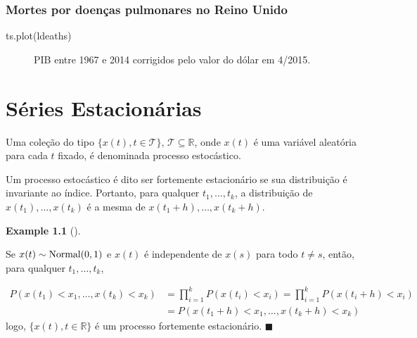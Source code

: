 \documentclass[
  letterpaper,
  DIV=11,
  numbers=noendperiod]{scrreprt}
\newenvironment{Shaded}{\begin{snugshade}}{\end{snugshade}}
\newcommand{\FunctionTok}[1]{\textcolor[rgb]{0.28,0.35,0.67}{#1}}
\newcommand{\NormalTok}[1]{\textcolor[rgb]{0.00,0.23,0.31}{#1}}
\theoremstyle{plain}
\theoremstyle{definition}
\theoremstyle{definition}
\newtheorem{example}{Example}[chapter]
\theoremstyle{remark}
\begin{document}
\hypertarget{mortes-por-doenuxe7as-pulmonares-no-reino-unido}{%
\subsection{Mortes por doenças pulmonares no Reino
Unido}\label{mortes-por-doenuxe7as-pulmonares-no-reino-unido}}

\begin{Shaded}
\begin{Highlighting}[]
\FunctionTok{ts.plot}\NormalTok{(ldeaths)}
\end{Highlighting}
\end{Shaded}

\begin{figure}

\begin{minipage}[t]{\linewidth}

{\centering 


\caption{PIB entre 1967 e 2014 corrigidos pelo valor do dólar em
4/2015.}

}

\end{minipage}%

\end{figure}


\hypertarget{suxe9ries-estacionuxe1rias}{%
\chapter{Séries Estacionárias}\label{suxe9ries-estacionuxe1rias}}

Uma coleção do tipo \(\{x(t),t\in\mathcal{T}\}\),
\(\mathcal{T}\subseteq \mathbb{R}\), onde \(x(t)\) é uma variável
aleatória para cada \(t\) fixado, é denominada processo estocástico.

Um processo estocástico é dito ser fortemente estacionário se sua
distribuição é invariante ao índice. Portanto, para qualquer
\(t_1,\ldots,t_k\), a distribuição de \(x(t_1),\ldots,x(t_k)\) é a mesma
de \(x(t_1+h),\ldots,x(t_k+h)\).

\begin{example}[]\protect\hypertarget{exm-serie_estacionaria_1}{}\label{exm-serie_estacionaria_1}

Se \(x(t)\sim \hbox{Normal}(0,1)\) e \(x(t)\) é independente de \(x(s)\)
para todo \(t\neq s\), então, para qualquer \(t_1,\ldots,t_k\),

\[\begin{align}P(x(t_1)<x_1,\ldots,x(t_k)<x_k)&=\prod_{i=1}^k P(x(t_i)<x_i)=\prod_{i=1}^k P(x(t_i+h)<x_i)\\&=P(x(t_1+h)<x_1,\ldots,x(t_k+h)<x_k)\end{align}\]
logo, \(\{x(t),t\in \mathbb{R}\}\) é um processo fortemente
estacionário. \(\blacksquare\)

\end{example}
\end{document}
